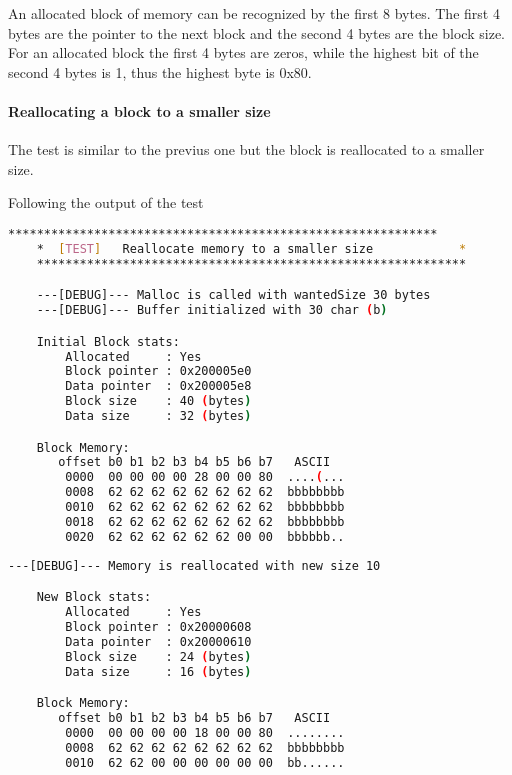     An allocated block of memory can be recognized by the first 8 bytes. The first 4 bytes are the pointer to the next block and the second 4 bytes are the block size. For an allocated block the first 4 bytes are zeros, while the highest bit of the second 4 bytes is 1, thus the highest byte is 0x80.

    \paragraph{Reallocating a block to a smaller size}
    The test is similar to the previus one but the block is reallocated to a smaller size.

    Following the output of the test

    \begin{outputbox}
    \begin{lstlisting}[language=bash]
    ************************************************************
    *  [TEST]   Reallocate memory to a smaller size            *
    ************************************************************

    ---[DEBUG]--- Malloc is called with wantedSize 30 bytes
    ---[DEBUG]--- Buffer initialized with 30 char (b)

    Initial Block stats:
        Allocated     : Yes
        Block pointer : 0x200005e0
        Data pointer  : 0x200005e8
        Block size    : 40 (bytes)
        Data size     : 32 (bytes)

    Block Memory:
       offset b0 b1 b2 b3 b4 b5 b6 b7   ASCII
        0000  00 00 00 00 28 00 00 80  ....(...
        0008  62 62 62 62 62 62 62 62  bbbbbbbb
        0010  62 62 62 62 62 62 62 62  bbbbbbbb
        0018  62 62 62 62 62 62 62 62  bbbbbbbb
        0020  62 62 62 62 62 62 00 00  bbbbbb..
    \end{lstlisting}
    \end{outputbox}

    \begin{outputbox}
    \begin{lstlisting}[language=bash]
    ---[DEBUG]--- Memory is reallocated with new size 10

    New Block stats:
        Allocated     : Yes
        Block pointer : 0x20000608
        Data pointer  : 0x20000610
        Block size    : 24 (bytes)
        Data size     : 16 (bytes)

    Block Memory:
       offset b0 b1 b2 b3 b4 b5 b6 b7   ASCII
        0000  00 00 00 00 18 00 00 80  ........
        0008  62 62 62 62 62 62 62 62  bbbbbbbb
        0010  62 62 00 00 00 00 00 00  bb......
    \end{lstlisting}
    \end{outputbox}

